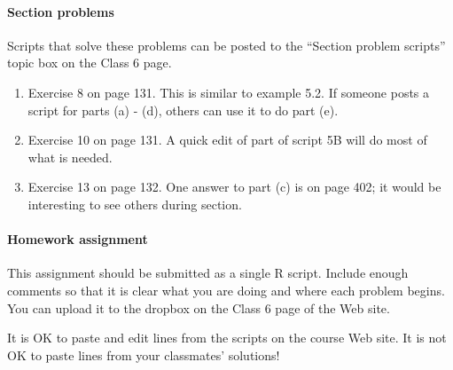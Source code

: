 \documentclass[12pt]{article}
\begin{document}
\pagebreak


\paragraph*{Section problems}

Scripts that solve these problems can be posted to the ``Section problem scripts'' topic box on the Class 6 page.

\begin{enumerate}

\item Exercise 8 on page 131. This is similar to example 5.2. If someone posts a script for parts (a) - (d), others can use it to do part (e).

\item Exercise 10 on page 131. A quick edit of part of script 5B will do most of what is needed.

\item Exercise 13 on page 132. One answer to part (c) is on page 402; it would be interesting to see others during section.



\end{enumerate}


\pagebreak


\paragraph*{Homework assignment}

This assignment should be submitted as a single R script. Include enough comments so that it is clear what you are doing and where each problem begins. You can upload it to the dropbox on the Class 6 page of the Web site. 

It is OK to paste and edit lines from the scripts on the course Web site. It is not OK to paste lines from your classmates' solutions!
\end{document}
